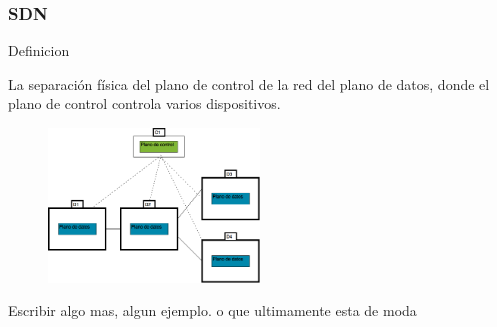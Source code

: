 \documentclass{beamer}
\begin{document}
\begin{frame}
\frametitle{SDN} 

\begin{block}{Definicion}

La separación física del plano de control de la red del plano de datos, donde el plano
de control controla varios dispositivos.

\end{block}

	\begin{figure}[H]
		\raggedright
		\includegraphics[width=0.5\textwidth, center]{imagenes/SDN-distribuido.png}
	\end{figure}

Escribir algo mas, algun ejemplo. o que ultimamente esta de moda

\end{frame}
\end{document}
